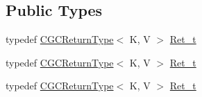 \subsection*{Public Types}
\begin{DoxyCompactItemize}
\item 
typedef \mbox{\hyperlink{structHadron_1_1CGCReturnType}{C\+G\+C\+Return\+Type}}$<$ K, V $>$ \mbox{\hyperlink{classHadron_1_1CGCMapObject_a154c1c2b41f7dad9d5692b4d2c6f5a2c}{Ret\+\_\+t}}
\item 
typedef \mbox{\hyperlink{structHadron_1_1CGCReturnType}{C\+G\+C\+Return\+Type}}$<$ K, V $>$ \mbox{\hyperlink{classHadron_1_1CGCMapObject_a154c1c2b41f7dad9d5692b4d2c6f5a2c}{Ret\+\_\+t}}
\item 
typedef \mbox{\hyperlink{structHadron_1_1CGCReturnType}{C\+G\+C\+Return\+Type}}$<$ K, V $>$ \mbox{\hyperlink{classHadron_1_1CGCMapObject_a154c1c2b41f7dad9d5692b4d2c6f5a2c}{Ret\+\_\+t}}
\end{DoxyCompactItemize}
